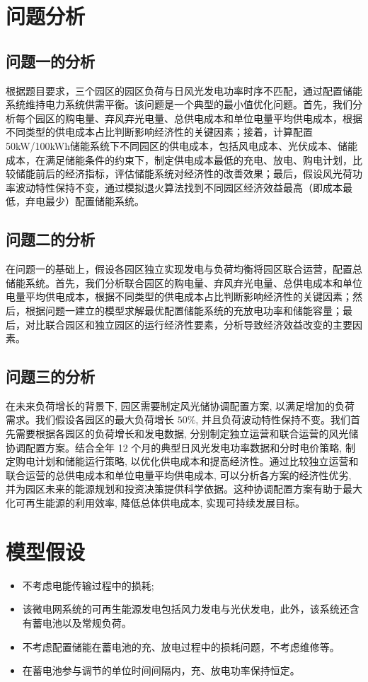 \documentclass{cumcmthesis}
\begin{document}
\section{问题分析}
\subsection{问题一的分析}
根据题目要求，三个园区的园区负荷与日风光发电功率时序不匹配，通过配置储能系统维持电力系统供需平衡。该问题是一个典型的最小值优化问题。首先，我们分析每个园区的购电量、弃风弃光电量、总供电成本和单位电量平均供电成本，根据不同类型的供电成本占比判断影响经济性的关键因素；接着，计算配置50kW/100kWh储能系统下不同园区的供电成本，包括风电成本、光伏成本、储能成本，在满足储能条件的约束下，制定供电成本最低的充电、放电、购电计划，比较储能前后的经济指标，评估储能系统对经济性的改善效果；最后，假设风光荷功率波动特性保持不变，通过模拟退火算法找到不同园区经济效益最高（即成本最低，弃电最少）配置储能系统。
\subsection{问题二的分析}
在问题一的基础上，假设各园区独立实现发电与负荷均衡将园区联合运营，配置总储能系统。首先，我们分析联合园区的购电量、弃风弃光电量、总供电成本和单位电量平均供电成本，根据不同类型的供电成本占比判断影响经济性的关键因素；然后，根据问题一建立的模型求解最优配置储能系统的充放电功率和储能容量；最后，对比联合园区和独立园区的运行经济性要素，分析导致经济效益改变的主要因素。
\subsection{问题三的分析}
在未来负荷增长的背景下, 园区需要制定风光储协调配置方案, 以满足增加的负荷需求。我们假设各园区的最大负荷增长 $50 \%$, 并且负荷波动特性保持不变。我们首先需要根据各园区的负荷增长和发电数据, 分别制定独立运营和联合运营的风光储协调配置方案。结合全年 12 个月的典型日风光发电功率数据和分时电价策略, 制定购电计划和储能运行策略, 以优化供电成本和提高经济性。通过比较独立运营和联合运营的总供电成本和单位电量平均供电成本, 可以分析各方案的经济性优劣, 并为园区未来的能源规划和投资决策提供科学依据。这种协调配置方案有助于最大化可再生能源的利用效率, 降低总体供电成本, 实现可持续发展目标。


\section{模型假设}
\begin{itemize}
\item 不考虑电能传输过程中的损耗;
\item 该微电网系统的可再生能源发电包括风力发电与光伏发电，此外，该系统还含有蓄电池以及常规负荷。
\item 不考虑配置储能在蓄电池的充、放电过程中的损耗问题，不考虑维修等。
\item 在蓄电池参与调节的单位时间间隔内，充、放电功率保持恒定。
\end{itemize}
\end{document}
